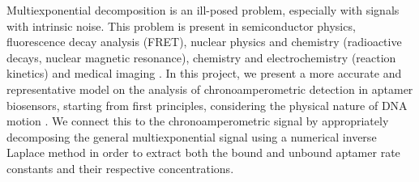 Multiexponential decomposition is an ill-posed problem, especially with signals with intrinsic noise. This problem is present in semiconductor physics, fluorescence decay analysis (FRET), nuclear physics and chemistry (radioactive decays, nuclear magnetic resonance), chemistry and
electrochemistry (reaction kinetics) and medical imaging \cite{jibia2012appraisal}.
In this project, we present a more accurate and representative model on the analysis of chronoamperometric detection in aptamer biosensors, starting from first principles, considering the physical nature of DNA motion \cite{ouldridge2012coarse}. We connect this to the chronoamperometric signal by appropriately decomposing the general multiexponential signal using a numerical inverse Laplace method \cite{provencher1982contin} in order to extract both the bound and unbound aptamer rate constants and their respective concentrations.\\\\

